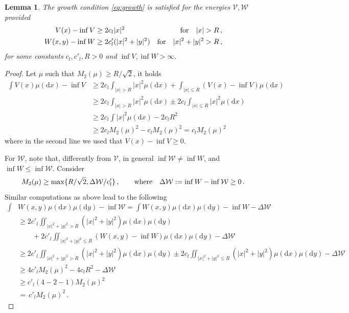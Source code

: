 \documentclass{article}
\theoremstyle{plain}
\newtheorem{lemma}[theorem]{Lemma}
\theoremstyle{definition}
\theoremstyle{remark}
\renewcommand{\d}{\mathrm{d}}
\begin{document}
\begin{lemma} \label{l:growth} The growth condition \eqref{eq:growth} is satisfied for the energies $\mathcal{V}, \mathcal{W}$ provided
\begin{align*}
V(x) - \inf V &\geq 2 c_l |x|^2   &\textup{for} \quad |x|> R\,, \\
W(x,y) - \inf W&\geq 2 c'_l (|x|^2 + |y|^2)  &\textup{for} \quad |x|^2+|y|^2> R\,,
\end{align*}
for some constants $c_l, c'_l, R>0$ and $\inf V, \inf W > \infty$.
\end{lemma}

\begin{proof}
Let  $\mu$ such that $M_2(\mu) \geq R/\sqrt{2} $, it holds
\begin{align*}
\int V(x)\mu(\d x) - \inf V &\geq 2c_l \int_{|x|>R} |x|^2\mu(\d x) + \int_{|x|\leq R}(V(x) - \inf V)\mu(\d x) \\
& \geq 2c_l \int_{|x|>R}|x|^2\mu(\d x) \pm 2c_l \int_{|x|\leq R}|x|^2\mu(\d x) \\
& \geq 2c_l\int|x|^2\mu(\d x) - 2c_l R^2 \\
& \geq 2c_lM_2(\mu)^2 - c_l M_2(\mu)^2  = c_l M_2(\mu)^2
\end{align*}
where in the second line we used that $V(x) - \inf V \geq 0$. 

For $\mathcal{W}$, note that, differently from $\mathcal{V}$, in general $\inf \mathcal{W} \neq \inf W$, and $\inf W \leq \inf \mathcal{W}$. Consider  
\[M_2(\mu)\geq \max \{R/\sqrt{2}, \Delta \mathcal{W}/c'_l  \}\,,
\qquad \textup{where}\quad
 \Delta \mathcal{W} := \inf W - \inf \mathcal{W}\geq 0\,.\] 
 Similar computations as above lead to the following
\begin{align*}
\int &W(x,y) \mu(\d x) \mu(\d y) - \inf \mathcal{W} 
 = \int W(x,y) \mu(\d x) \mu(\d y) - \inf W - \Delta \mathcal{W} \\
 & \geq 2 c'_l \iint_{|x|^2+|y|^2>R}(|x|^2 + |y|^2)\mu(\d x) \mu(\d y) \\
 & \qquad + 2c'_l \iint_{|x|^2+|y|^2\leq R}(W(x,y)- \inf W)\mu(\d x) \mu(\d y) - \Delta \mathcal{W} \\
 & \geq 2 c'_l \iint_{|x|^2+|y|^2>R}(|x|^2 + |y|^2)\mu(\d x) \mu(\d y) \pm 2c_l \iint_{|x|^2 + |y|^2\leq R}(|x|^2 + |y|^2)\mu(\d x) \mu(\d y) - \Delta \mathcal{W} \\
 & \geq 4 c'_l M_2(\mu)^2 - 4c_lR^2 - \Delta \mathcal{W} \\
 & \geq c'_l (4 -2 -1) M_2(\mu)^2 \\
 &= \,c'_l M_2(\mu)^2\,.
\end{align*}
\end{proof}
\end{document}
